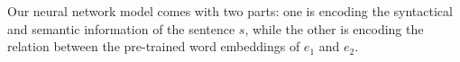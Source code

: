 
Our neural network model comes with two parts:
one is encoding the syntactical and semantic information of the sentence $s$, while the other is encoding the relation between the pre-trained word embeddings of $e_1$ and $e_2$.


